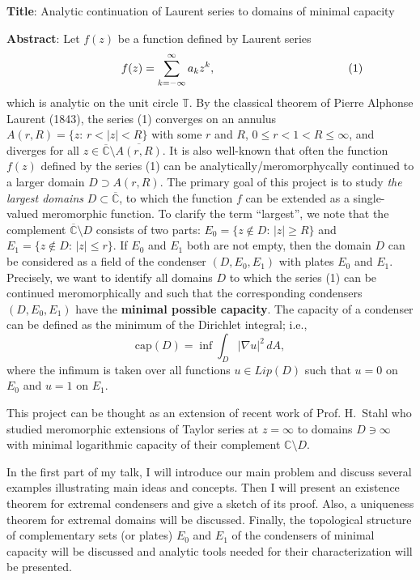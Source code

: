 \documentclass[12pt]{amsart}
\begin{document}
\textbf{Title}: Analytic continuation of Laurent series  to
domains of minimal capacity

\bigskip

\textbf{Abstract}: Let   $f(z)$ be a  function defined by
Laurent series %
$$ %
\ \ \ \ \ \ \ \ \ \ \ \ \ \ \ \ \ f(z)=\sum_{k=-\infty}^\infty a_k
z^k, {\mbox{\hspace{4cm} (1)}}
$$ %
which is analytic  on the unit circle $\mathbb{T}$. By the
classical theorem of Pierre Alphonse Laurent (1843), the series
(1) converges %
on an annulus $A(r,R)=\{z:\, r<|z|<R\}$ with some $r$ and $R$,
$0\le r<1<R\le \infty$, and diverges for all $z\in
\overline{\mathbb{C}}\setminus \overline{A(r,R)}$. It is also
well-known that often the function $f(z)$ defined by the series
(1) can be analytically/meromorphycally  continued to a larger
domain $D\supset A(r,R)$.  The primary goal of this project is to
study \emph{the largest domains} $D \subset
\overline{\mathbb{C}}$, to which the function $f$ can be extended
as a single-valued meromorphic function. To clarify the term
``largest'', we note that the complement
$\overline{\mathbb{C}}\setminus D$ consists of two parts:
$E_0=\{z\not\in D:\, |z|\ge R\}$ and $E_1=\{z\not\in D:\, |z|\le
r\}$. If $E_0$ and $E_1$ both are not empty, then the domain $D$
can be considered as a field of the condenser $(D,E_0,E_1)$ with
plates $E_0$ and $E_1$. Precisely, we want to identify all domains
$D$ to which the series (1) can be continued meromorphically and
such that the corresponding condensers $(D,E_0,E_1)$ have the
\textbf{minimal possible capacity}. The capacity of a condenser
can be defined as the minimum of the Dirichlet integral; i.e.,
$$ %
{\mbox{cap}}(D)=\inf \int_D|\nabla u|^2\,dA,
$$ %
where the infimum is taken over all functions $u\in Lip(D)$ such
that $u=0$ on $E_0$ and $u=1$ on $E_1$.

 This project can be thought as an extension of recent work of Prof. H.~Stahl
 who studied meromorphic extensions of Taylor series at $z=\infty$ to domains $D\ni \infty$
 with minimal logarithmic capacity of their complement $\mathbb{C}\setminus D$.

In the first part of my talk, I will introduce our main problem
and discuss several examples illustrating main ideas and concepts.
Then I will present an existence theorem for extremal condensers
and give a sketch of its proof. Also, a uniqueness theorem for
extremal domains will be discussed. Finally, the topological
structure of complementary sets (or plates) $E_0$ and $E_1$ of the
condensers of minimal capacity will be discussed  and analytic
tools needed for their characterization will be  presented.
\end{document}
